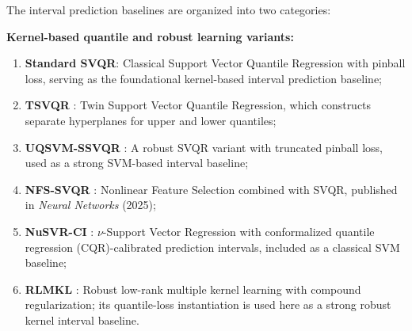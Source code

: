 

The interval prediction baselines are organized into two categories:

\textbf{Kernel-based quantile and robust learning variants:}
\begin{enumerate}
    \item \textbf{Standard SVQR}: Classical Support Vector Quantile Regression with pinball loss, serving as the foundational kernel-based interval prediction baseline;
    \item \textbf{TSVQR} \citep{tsvqr2023}: Twin Support Vector Quantile Regression, which constructs separate hyperplanes for upper and lower quantiles;
    \item \textbf{UQSVM-SSVQR} \citep{wang2024ssvqr}: A robust SVQR variant with truncated pinball loss, used as a strong SVM-based interval baseline;
    \item \textbf{NFS-SVQR} \citep{ye2025nfs}: Nonlinear Feature Selection combined with SVQR, published in \textit{Neural Networks} (2025);
    \item \textbf{NuSVR-CI} \citep{romano2019cqr}: $\nu$-Support Vector Regression with conformalized quantile regression (CQR)-calibrated prediction intervals, included as a classical SVM baseline;
    \item \textbf{RLMKL} \citep{jiang2021rlmkl}: Robust low-rank multiple kernel learning with compound regularization; its quantile-loss instantiation is used here as a strong robust kernel interval baseline.
\end{enumerate}


